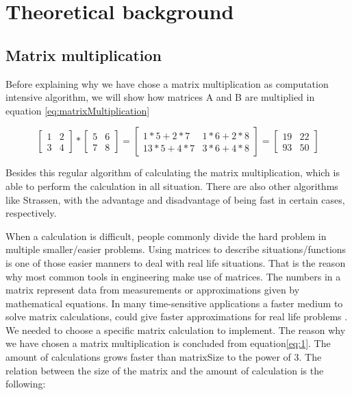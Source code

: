 \documentclass[12pt,a4paper,english,twoside,openright]{tutthesis}
\begin{document}
\chapter{Theoretical background}
	\section{Matrix multiplication}
Before explaining why we have chose a matrix multiplication as computation intensive algorithm, we will show how matrices A and B are multiplied in equation \ref{eq:matrixMultiplication}

\begin{equation} \label{eq:matrixMultiplication}
	 \begin{bmatrix}
	1 & 2 \\[0.2em]
	3 & 4
	\end{bmatrix}
	*
	 \begin{bmatrix}
	5 & 6 \\[0.2em]
	7 & 8
	\end{bmatrix}
	=
	 \begin{bmatrix}
	1*5+2*7 & 1*6+2*8 \\[0.2em]
	13*5+4*7 & 3*6+4*8
	\end{bmatrix}
	=
	 \begin{bmatrix}
	19 & 22 \\[0.2em]
	93 & 50
	\end{bmatrix}
\end{equation}

Besides this regular algorithm of calculating the matrix multiplication, which is able to perform the calculation in all situation. There are also other algorithms like Strassen, with the advantage and disadvantage of being fast in certain cases, respectively.

When a calculation is difficult, people commonly divide the hard problem in multiple smaller/easier problems. Using matrices to describe situations/functions is one of those easier manners to deal with real life situations. That is the reason why most common tools in engineering make use of matrices. The numbers in a matrix represent data from measurements or approximations given by mathematical equations. In many time-sensitive applications a faster medium to solve matrix calculations, could give faster approximations for real life problems \cite{Hardesty2013}. We needed to choose a specific matrix calculation to implement. The reason why we have chosen a matrix multiplication is concluded from equation\ref{eq:1}. The amount of calculations grows faster than matrixSize to the power of 3. The relation between the size of the matrix and the amount of calculation is the following:
\end{document}
